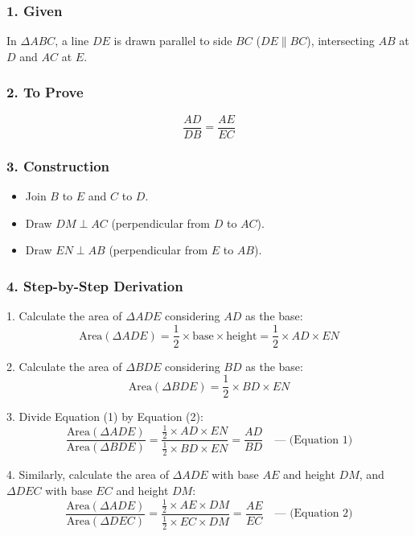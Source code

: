 \begin{enumerate}[label=\thesubsection.\arabic*, ref=\thesubsection.\theenumi]
\solution


\subsubsection*{1. Given}
In $\Delta ABC$, a line $DE$ is drawn parallel to side $BC$ ($DE \parallel BC$), intersecting $AB$ at $D$ and $AC$ at $E$.

\subsubsection*{2. To Prove}
\[
\frac{AD}{DB} = \frac{AE}{EC}
\]

\subsubsection*{3. Construction}
\begin{itemize}
	
 \item Join $B$ to $E$ and $C$ to $D$.
   
 \item  Draw $DM \perp AC$ (perpendicular from $D$ to $AC$).
    
 \item Draw $EN \perp AB$ (perpendicular from $E$ to $AB$).\end{itemize} 


\subsubsection*{4. Step-by-Step Derivation}

	

1. Calculate the area of $\Delta ADE$ considering $AD$ as the base:
   \[
   \text{Area}(\Delta ADE) = \frac{1}{2} \times \text{base} \times \text{height} = \frac{1}{2} \times AD \times EN
   \]

2. Calculate the area of $\Delta BDE$ considering $BD$ as the base:
   \[
   \text{Area}(\Delta BDE) = \frac{1}{2} \times BD \times EN
   \]

3. Divide Equation (1) by Equation (2):
   \[
   \frac{\text{Area}(\Delta ADE)}{\text{Area}(\Delta BDE)} = \frac{\frac{1}{2} \times AD \times EN}{\frac{1}{2} \times BD \times EN} = \frac{AD}{BD} \quad \text{--- (Equation 1)}
   \]

4. Similarly, calculate the area of $\Delta ADE$ with base $AE$ and height $DM$, and $\Delta DEC$ with base $EC$ and height $DM$:
   \[
   \frac{\text{Area}(\Delta ADE)}{\text{Area}(\Delta DEC)} = \frac{\frac{1}{2} \times AE \times DM}{\frac{1}{2} \times EC \times DM} = \frac{AE}{EC} \quad \text{--- (Equation 2)}
   \]


\end{enumerate}
